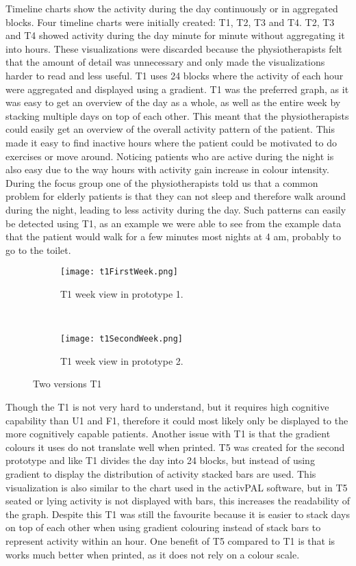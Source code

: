 Timeline charts show the activity during the day continuously or in aggregated blocks. Four timeline charts were initially created: T1, T2, T3 and T4. T2, T3 and T4 showed activity during the day minute for minute without aggregating it into hours. These visualizations were discarded because the physiotherapists felt that the amount of detail was unnecessary and only made the visualizations harder to read and less useful. T1 uses 24 blocks where the activity of each hour were aggregated and displayed using a gradient. T1 was the preferred graph, as it was easy to get an overview of the day as a whole, as well as the entire week by stacking multiple days on top of each other. This meant that the physiotherapists could easily get an overview of the overall activity pattern of the patient. This made it easy to find inactive hours where the patient could be motivated to do exercises or move around. Noticing patients who are active during the night is also easy due to the way hours with activity gain increase in colour intensity. During the focus group one of the physiotherapists told us that a common problem for elderly patients is that they can not sleep and therefore walk around during the night, leading to less activity during the day. Such patterns can easily be detected using T1, as an example we were able to see from the example data that the patient would walk for a few minutes most nights at 4 am, probably to go to the toilet.

\begin{figure}[h!]
  \centering
  \begin{subfigure}[b]{1\textwidth}
    \centering
    \texttt{[image: t1FirstWeek.png]}
    \caption{\footnotesize T1 week view in prototype 1.}
  \end{subfigure}
  \\
  \begin{subfigure}[b]{0.6\textwidth}
    \centering
    \texttt{[image: t1SecondWeek.png]}
    \caption{\footnotesize T1 week view in prototype 2.}
  \end{subfigure} 
  \caption{Two versions T1}
  \label{fig:tComparison}
\end{figure} 

Though the T1 is not very hard to understand,  but it requires high cognitive capability than U1 and F1, therefore it could most likely only be displayed to the more cognitively capable patients. Another issue with T1 is that the gradient colours it uses do not translate well when printed. T5 was created for the second prototype and like T1 divides the day into 24 blocks, but instead of using gradient to display the distribution of activity stacked bars are used. This visualization is also similar to the chart used in the activPAL software, but in T5 seated or lying activity is not displayed with bars, this increases the readability of the graph. Despite this T1 was still the favourite because it is easier to stack days on top of each other when using gradient colouring instead of stack bars to represent activity within an hour. One benefit of T5 compared to T1 is that is works much better when printed, as it does not rely on a colour scale.

